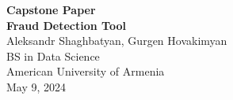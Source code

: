 \documentclass[a4paper,twocolumn,12pt]{article}
\begin{document}
\onecolumn %
\thispagestyle{empty} %

\vspace*{6cm} 



\begin{center}
    {\Large\textbf{Capstone Paper}}\\[0.5cm] %
    {\Large\textbf{Fraud Detection Tool}}\\[1.5cm] %
    
    {\large Aleksandr Shaghbatyan, Gurgen Hovakimyan}\\[1cm] %
    
    {\large BS in Data Science}\\[1cm] %
    
    {\large American University of Armenia}\\[1cm] %
    
    {\large May 9, 2024} %
\end{center}

\newpage

\vspace*{3cm} 

\tableofcontents

\newpage
\twocolumn %



\end{document}
